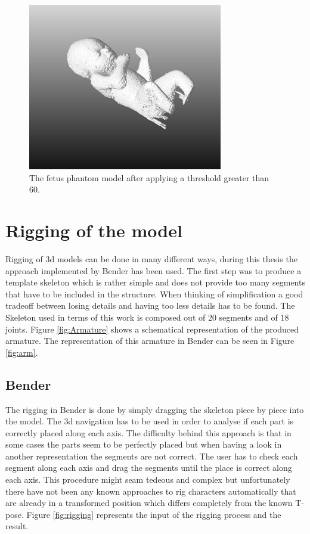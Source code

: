\begin{figure} [!htb]
    \centering
	\includegraphics[width=8.5cm]{content/images/phantomFetusCCA}
	\caption{The fetus phantom model after applying a threshold greater than 60.} 
	\label{fig:phantomFetusCCA}
\end{figure}

\newpage
\section{Rigging of the model}\label{sct:rigging}

Rigging of \gls{3d} models can be done in many different ways, during this thesis the approach implemented by Bender \cite{Finet2014Bender:Morphing} has been used. The first step was to produce a template skeleton which is rather simple and does not provide too many segments that have to be included in the structure. When thinking of simplification a good tradeoff between losing details and having too less details has to be found. The Skeleton used in terms of this work is composed out of 20 segments and of 18 joints. Figure \ref{fig:Armature} shows a schematical representation of the produced armature. The representation of this armature in Bender can be seen in Figure \ref{fig:arm}.\newline

\subsection{Bender}
The rigging in Bender is done by simply dragging the skeleton piece by piece into the model. The \gls{3d} navigation has to be used in order to analyse if each part is correctly placed along each axis. The difficulty behind this approach is that in some cases the parts seem to be perfectly placed but when having a look in another representation the segments are not correct. The user has to check each segment along each axis and drag the segments until the place is correct along each axis. This procedure might seam tedeous and complex but unfortunately there have not been any known approaches to rig characters automatically that are already in a transformed position which differs completely from the known T-pose. Figure \ref{fig:rigging} represents the input of the rigging process and the result.

